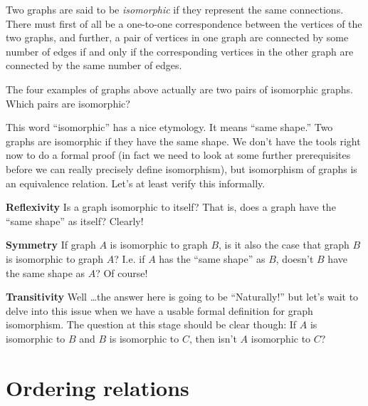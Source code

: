 \begin{center}

\end{center}

Two graphs are said to be  \emph{isomorphic} if they
represent the same connections.  There must first of all be a one-to-one correspondence
between the vertices of the two graphs, and further, a pair of vertices in one
graph are connected by some number of edges if and only if the corresponding vertices in the other graph
are connected by the same number of edges.

\begin{exer}
The four examples of graphs above actually are two pairs of isomorphic graphs.
Which pairs are isomorphic?
\end{exer}

This word ``isomorphic'' has a nice etymology.  It means ``same shape.''  Two graphs are
isomorphic if they have the same shape.  We don't have the tools right now to do a formal
proof (in fact we need to look at some further prerequisites before we can really precisely
define isomorphism), but isomorphism of graphs is an equivalence relation. Let's at least 
verify this informally.

{\bf Reflexivity}  Is a graph isomorphic to itself?  That is, does a graph have the ``same 
shape'' as itself?  Clearly!

{\bf Symmetry}  If graph $A$ is isomorphic to graph $B$, is it also the case that graph $B$
is isomorphic to graph $A$?  I.e. if $A$ has the ``same shape'' as $B$, doesn't $B$ have the
same shape as $A$?  Of course!

{\bf Transitivity}  Well \ldots the answer here is going to be ``Naturally!'' but let's wait
to delve into this issue when we have a usable formal definition for graph isomorphism.  The
question at this stage should be clear though: If $A$ is isomorphic to $B$ and $B$ is isomorphic 
to $C$, then isn't $A$ isomorphic to $C$?

\newpage





\newpage

\section{Ordering relations}
\label{sec:ord_rel}

